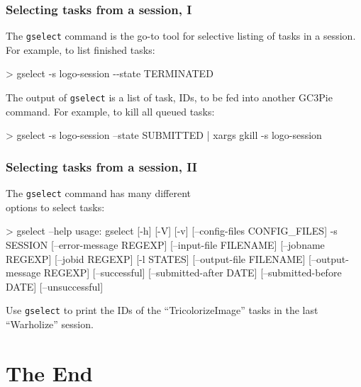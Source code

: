 \documentclass[english,serif,mathserif,usenames,dvipsnames]{beamer}
\begin{document}
\begin{frame}[fragile]
  \frametitle{Selecting tasks from a session, I}

  The \texttt{gselect} command is the go-to tool for selective listing
  of tasks in a session.  For example, to list finished tasks:
\begin{semiverbatim}
    > gselect -s logo-session -{}-state TERMINATED
\end{semiverbatim}

  \+ The output of \texttt{gselect} is a list of task, IDs, to be fed
  into another GC3Pie command.  For example, to kill all queued tasks:
  \begin{stdout}
    > gselect -s logo-session --state SUBMITTED | xargs gkill -s logo-session
  \end{stdout}
\end{frame}

\begin{frame}[fragile]
  \frametitle{Selecting tasks from a session, II}

  The \texttt{gselect} command has many different \\ options to select tasks:
  \begin{stdout}
> gselect --help
usage: gselect [-h] [-V] [-v] [--config-files CONFIG_FILES] -s SESSION
               [--error-message REGEXP] [--input-file FILENAME]
               [--jobname REGEXP] [--jobid REGEXP] [-l STATES]
               [--output-file FILENAME] [--output-message REGEXP]
               [--successful] [--submitted-after DATE]
               [--submitted-before DATE] [--unsuccessful]
  \end{stdout}

  \+
  \begin{exercise*}
    Use \texttt{gselect} to print the IDs of the ``TricolorizeImage''
    tasks in the last ``Warholize'' session.
  \end{exercise*}
\end{frame}



\section{The End}
\end{document}
